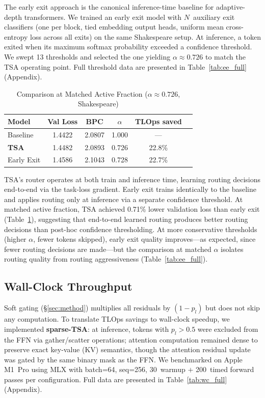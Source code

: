 \documentclass{article}
\newcommand{\tsa}{TSA\xspace}
\newcommand{\tlops}{TLOps\xspace}
\begin{document}
The early exit approach \citep{elbayad2020depth} is the canonical inference-time
baseline for adaptive-depth transformers. We trained an early exit model with
$N$~auxiliary exit classifiers (one per block, tied embedding output heads, uniform
mean cross-entropy loss across all exits) on the same Shakespeare setup. At inference,
a token exited when its maximum softmax probability exceeded a confidence threshold.
We swept 13 thresholds and selected the one yielding $\alpha \approx 0.726$ to match
the \tsa operating point. Full threshold data are presented in
Table~\ref{tab:ee_full} (Appendix).

\begin{table}[h]
\centering
\caption{Comparison at Matched Active Fraction ($\alpha \approx 0.726$, Shakespeare)}
\label{tab:early_exit}
\small
\begin{tabular}{lccccc}
\toprule
Model & Val Loss & BPC & $\alpha$ & TLOps saved \\
\midrule
Baseline       & 1.4422 & 2.0807 & 1.000 & ---    \\
\textbf{TSA}   & 1.4482 & 2.0893 & 0.726 & 22.8\% \\
Early Exit     & 1.4586 & 2.1043 & 0.728 & 22.7\% \\
\bottomrule
\end{tabular}
\end{table}

\tsa's router operates at both train and inference time, learning routing decisions
end-to-end via the task-loss gradient. Early exit trains identically to the baseline
and applies routing only at inference via a separate confidence threshold. At matched
active fraction, \tsa achieved 0.71\% lower validation loss than early exit
(Table~\ref{tab:early_exit}), suggesting that end-to-end learned routing produces
better routing decisions than post-hoc confidence thresholding. At more conservative
thresholds (higher $\alpha$, fewer tokens skipped), early exit quality improves---as
expected, since fewer routing decisions are made---but the comparison at matched
$\alpha$ isolates routing quality from routing aggressiveness
(Table~\ref{tab:ee_full}).

\subsection{Wall-Clock Throughput}
\label{sec:ablation_wc}

Soft gating (\S\ref{sec:method}) multiplies all residuals by $(1{-}p_l)$ but does
not skip any computation. To translate \tlops savings to wall-clock speedup, we
implemented \textbf{sparse-TSA}: at inference, tokens with $p_l > 0.5$ were excluded
from the FFN via gather/scatter operations; attention computation remained dense
to preserve exact key-value (KV) semantics, though the attention residual update was gated by
the same binary mask as the FFN. We benchmarked on Apple M1~Pro using
MLX \citep{mlx2023} with batch=64, seq=256, 30~warmup $+$ 200~timed forward
passes per configuration. Full data are presented in Table~\ref{tab:wc_full}
(Appendix).
\end{document}
